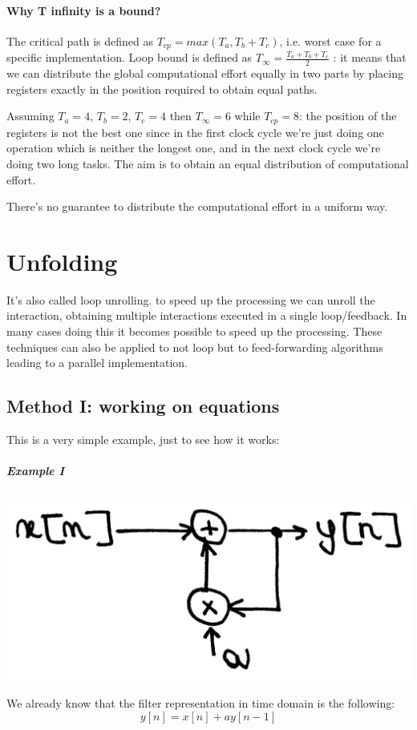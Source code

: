 \paragraph{Why T infinity is a bound?}
The critical path is defined as $T_{cp}=max(T_a, T_b+T_c)$, i.e. worst case for a specific implementation.
Loop bound is defined as $T_{\infty}=\frac{T_a+T_b+T_c}{2}$ : it means that we can distribute the global computational effort equally in two parts by placing registers exactly in the position required to obtain equal paths.

Assuming $T_a=4$, $T_b=2$, $T_c=4$ then $T_{\infty}=6$ while $T_{cp}=8$: the position of the registers is not the best one since in the first clock cycle we're just doing one operation which is neither the longest one, and in the next clock cycle we're doing two long tasks. The aim is to obtain an equal distribution of computational effort.

There's no guarantee to distribute the computational effort in a uniform way.

\section{Unfolding}
It's also called loop unrolling. to speed up the processing we can unroll the interaction, obtaining multiple interactions executed in a single loop/feedback. In many cases doing this it becomes possible to speed up the processing. These techniques can also be applied to not loop but to feed-forwarding algorithms leading to a parallel implementation.

\subsection{Method I: working on equations}
This is a very simple example, just to see how it works:

\subparagraph{Example I}
\begin{center}
  \includegraphics[width=0.6\linewidth]{img/img1/20}
\end{center}

We already know that the filter representation in time domain is the following:
$$y[n]=x[n]+ay[n-1]$$

